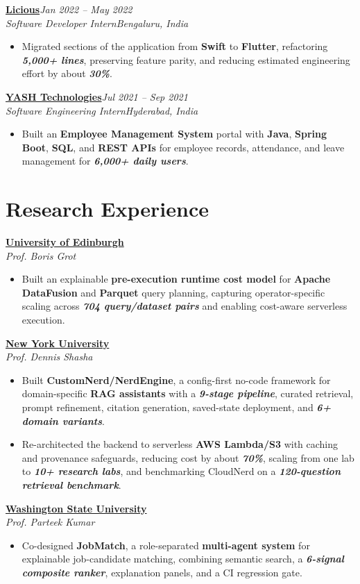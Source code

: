 \documentclass[10pt,a4paper]{article}
\newcommand{\metric}[1]{\textbf{\textit{#1}}}
\newcommand{\tech}[1]{\textbf{#1}}
\newcommand{\project}[1]{\textbf{#1}}
\newcommand{\entry}[4]{%
  \textbf{\underline{#1}}\hfill\textit{#3}\\%
  \textit{#2}\hfill \textit{#4}\vspace{-1pt}%
}
\newcommand{\researchentry}[2]{%
  \textbf{\underline{#1}}\\%
  \textit{#2}\vspace{-1pt}%
}
\begin{document}
\entry{Licious}{Software Developer Intern}{Jan 2022 -- May 2022}{Bengaluru, India}
\begin{itemize}
  \item Migrated sections of the application from \tech{Swift} to \tech{Flutter}, refactoring \metric{5,000+ lines}, preserving feature parity, and reducing estimated engineering effort by about \metric{30\%}.
\end{itemize}

\entry{YASH Technologies}{Software Engineering Intern}{Jul 2021 -- Sep 2021}{Hyderabad, India}
\begin{itemize}
  \item Built an \project{Employee Management System} portal with \tech{Java}, \tech{Spring Boot}, \tech{SQL}, and \tech{REST APIs} for employee records, attendance, and leave management for \metric{6,000+ daily users}.
\end{itemize}

\section{Research Experience}
\researchentry{University of Edinburgh}{Prof. Boris Grot}
\begin{itemize}
  \item Built an explainable \project{pre-execution runtime cost model} for \tech{Apache DataFusion} and \tech{Parquet} query planning, capturing operator-specific scaling across \metric{704 query/dataset pairs} and enabling cost-aware serverless execution.
\end{itemize}

\researchentry{New York University}{Prof. Dennis Shasha}
\begin{itemize}
  \item Built \project{CustomNerd/NerdEngine}, a config-first no-code framework for domain-specific \tech{RAG assistants} with a \metric{9-stage pipeline}, curated retrieval, prompt refinement, citation generation, saved-state deployment, and \metric{6+ domain variants}.
  \item Re-architected the backend to serverless \tech{AWS Lambda/S3} with caching and provenance safeguards, reducing cost by about \metric{70\%}, scaling from one lab to \metric{10+ research labs}, and benchmarking CloudNerd on a \metric{120-question retrieval benchmark}.
\end{itemize}

\researchentry{Washington State University}{Prof. Parteek Kumar}
\begin{itemize}
  \item Co-designed \project{JobMatch}, a role-separated \tech{multi-agent system} for explainable job-candidate matching, combining semantic search, a \metric{6-signal composite ranker}, explanation panels, and a CI regression gate.
\end{itemize}
\end{document}
